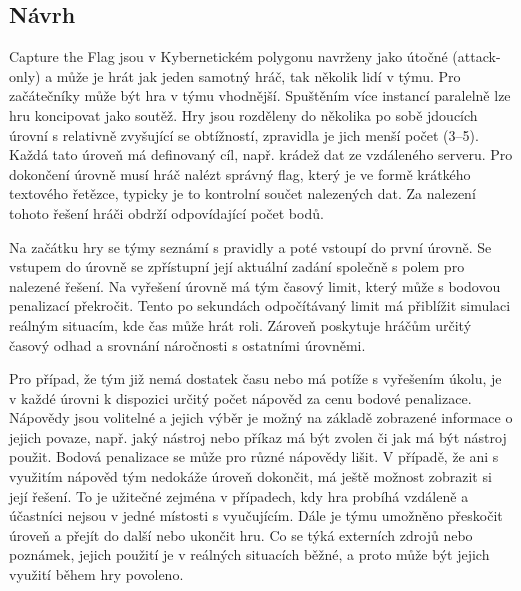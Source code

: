 \documentclass[
  digital, %
  oneside, %
  table,   %
  nolof,     %
  nolot,     %
]{fithesis3}
\begin{document}
\subsection{Návrh} \label{gameDesign}
Capture the Flag jsou v Kybernetickém polygonu navrženy jako útočné (attack-only) a může je hrát jak jeden samotný hráč, tak několik lidí v týmu. Pro začátečníky může být hra v týmu vhodnější. Spuštěním více instancí paralelně lze hru koncipovat jako soutěž. Hry jsou rozděleny do několika po sobě jdoucích úrovní s relativně zvyšující se obtížností, zpravidla je jich menší počet (3–5). Každá tato úroveň má definovaný cíl, např. krádež dat ze vzdáleného serveru. Pro dokončení úrovně musí hráč nalézt správný flag, který je ve formě krátkého textového řetězce, typicky je to kontrolní součet nalezených dat. Za nalezení tohoto řešení hráči obdrží odpovídající počet bodů.\par
Na začátku hry se týmy seznámí s pravidly a poté vstoupí do první úrovně. Se vstupem do úrovně se zpřístupní její aktuální zadání společně s polem pro nalezené řešení. Na vyřešení úrovně má tým časový limit, který může s bodovou penalizací překročit. Tento po sekundách odpočítávaný limit má přiblížit simulaci reálným situacím, kde čas může hrát roli. Zároveň poskytuje hráčům určitý časový odhad a srovnání náročnosti s ostatními úrovněmi.\par
Pro případ, že tým již nemá dostatek času nebo má potíže s vyřešením úkolu, je v každé úrovni k dispozici určitý počet nápověd za cenu bodové penalizace. Nápovědy jsou volitelné a jejich výběr je možný na základě zobrazené informace o jejich povaze, např. jaký nástroj nebo příkaz má být zvolen či jak má být nástroj použit. Bodová penalizace se může pro různé nápovědy lišit. V případě, že ani s využitím nápověd tým nedokáže úroveň dokončit, má ještě možnost zobrazit si její řešení. To je užitečné zejména v případech, kdy hra probíhá vzdáleně a účastníci nejsou v jedné místosti s vyučujícím. Dále je týmu umožněno přeskočit úroveň a přejít do další nebo ukončit hru. Co se týká externích zdrojů nebo poznámek, jejich použití je v reálných situacích běžné, a proto může být jejich využití během hry povoleno. \cite{ctfDesign}\par
\end{document}
